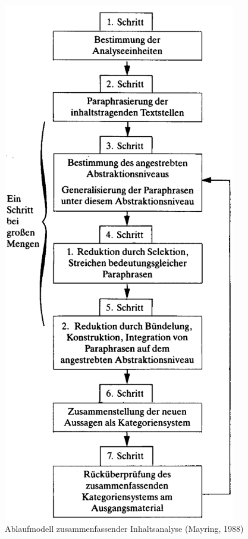 \begin{figure}[H]
	\begin{minipage}[b]{.4\linewidth} %
		\includegraphics[scale=0.5]{Abbildungen/zusammenfassendeInhaltsanalyse.png}
		\caption{Ablaufmodell zusammenfassender Inhaltsanalyse (Mayring, 1988) \cite{mayring2019qualitative}}
		\label{fig:zusammenfassendeinhaltsanalyse}
	\end{minipage}
	\hspace{.1\linewidth}%
	\begin{minipage}[b]{.4\linewidth} %

\end{minipage}
\end{figure}
